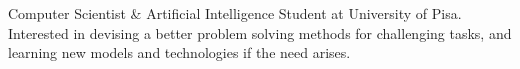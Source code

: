 

\begin{cvparagraph}

Computer Scientist \& Artificial Intelligence Student at University of Pisa. Interested in devising a better problem solving methods for challenging tasks, and learning new models and technologies if the need arises.
\end{cvparagraph}
